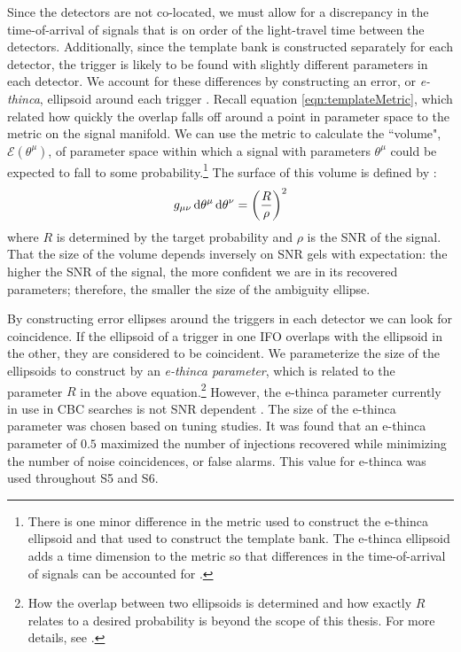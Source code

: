 Since the detectors are not co-located, we must allow for a discrepancy in the time-of-arrival of signals that is on order of the light-travel time between the detectors. Additionally, since the template bank is constructed separately for each detector, the trigger is likely to be found with slightly different parameters in each detector. We account for these differences by constructing an error, or \emph{e-thinca}, ellipsoid around each trigger \cite{Robinson:2008}. Recall equation \ref{eqn:templateMetric}, which related how quickly the overlap falls off around a point in parameter space to the metric on the signal manifold. We can use the metric to calculate the ``volume", $\mathcal{E}(\theta^\mu)$, of parameter space within which a signal with parameters $\theta^\mu$ could be expected to fall to some probability.\footnote{There is one minor difference in the metric used to construct the e-thinca ellipsoid and that used to construct the template bank. The e-thinca ellipsoid adds a time dimension to the metric so that differences in the time-of-arrival of signals can be accounted for \cite{Robinson:2008}.} The surface of this volume is defined by \cite{Robinson:2008}:
\begin{equation}
\label{eqn:e-thinca}
g_{\mu\nu}\d\theta^\mu \d\theta^\nu = \left(\frac{R}{\rho}\right)^2
\end{equation}
where $R$ is determined by the target probability and $\rho$ is the \ac{SNR} of the signal. That the size of the volume depends inversely on \ac{SNR} gels with expectation: the higher the \ac{SNR} of the signal, the more confident we are in its recovered parameters; therefore, the smaller the size of the ambiguity ellipse.

By constructing error ellipses around the triggers in each detector we can look for coincidence. If the ellipsoid of a trigger in one \ac{IFO} overlaps with the ellipsoid in the other, they are considered to be coincident. We parameterize the size of the ellipsoids to construct by an \emph{e-thinca parameter}, which is related to the parameter $R$ in the above equation.\footnote{How the overlap between two ellipsoids is determined and how exactly $R$ relates to a desired probability is beyond the scope of this thesis. For more details, see \cite{Robinson:2008}.} However, the e-thinca parameter currently in use in \ac{CBC} searches is not \ac{SNR} dependent \cite{Robinson:2008}. The size of the e-thinca parameter was chosen based on tuning studies. It was found \cite{Keppel:thesis} that an e-thinca parameter of $0.5$ maximized the number of injections recovered while minimizing the number of noise coincidences, or false alarms. This value for e-thinca was used throughout \ac{S5} and \ac{S6}.

